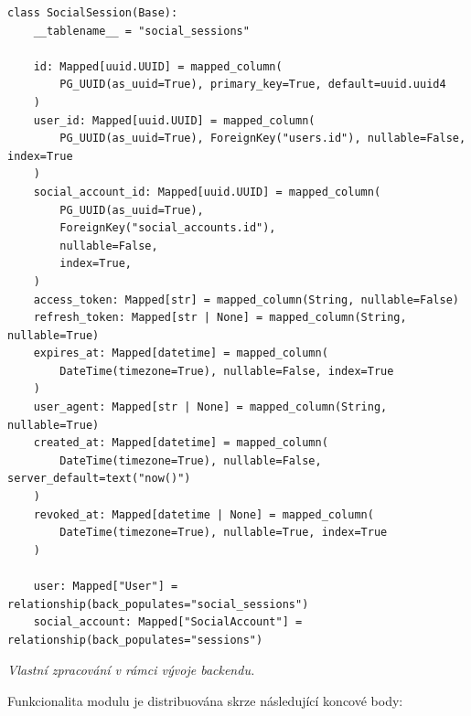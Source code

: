 \documentclass[male,czech,api_bc]{kitheses}
\newcommand{\zdroj}[1]{%
    \vspace{1ex}%
    {\footnotesize \raggedright \textit{#1}\par}%
}
\begin{document}
\begin{listing}[htbp]
\begin{verbatim}
class SocialSession(Base):
    __tablename__ = "social_sessions"
 
    id: Mapped[uuid.UUID] = mapped_column(
        PG_UUID(as_uuid=True), primary_key=True, default=uuid.uuid4
    )
    user_id: Mapped[uuid.UUID] = mapped_column(
        PG_UUID(as_uuid=True), ForeignKey("users.id"), nullable=False, index=True
    )
    social_account_id: Mapped[uuid.UUID] = mapped_column(
        PG_UUID(as_uuid=True),
        ForeignKey("social_accounts.id"),
        nullable=False,
        index=True,
    )
    access_token: Mapped[str] = mapped_column(String, nullable=False)
    refresh_token: Mapped[str | None] = mapped_column(String, nullable=True)
    expires_at: Mapped[datetime] = mapped_column(
        DateTime(timezone=True), nullable=False, index=True
    )
    user_agent: Mapped[str | None] = mapped_column(String, nullable=True)
    created_at: Mapped[datetime] = mapped_column(
        DateTime(timezone=True), nullable=False, server_default=text("now()")
    )
    revoked_at: Mapped[datetime | None] = mapped_column(
        DateTime(timezone=True), nullable=True, index=True
    )
 
    user: Mapped["User"] = relationship(back_populates="social_sessions")
    social_account: Mapped["SocialAccount"] = relationship(back_populates="sessions")
\end{verbatim}
\caption{Implementace modelu SocialSession podporující Dual-FK vazbu}
\label{lst:social_session_model}
\zdroj{Vlastní zpracování v rámci vývoje backendu.}
\end{listing}

Funkcionalita modulu je distribuována skrze následující koncové body:
 
\end{document}

